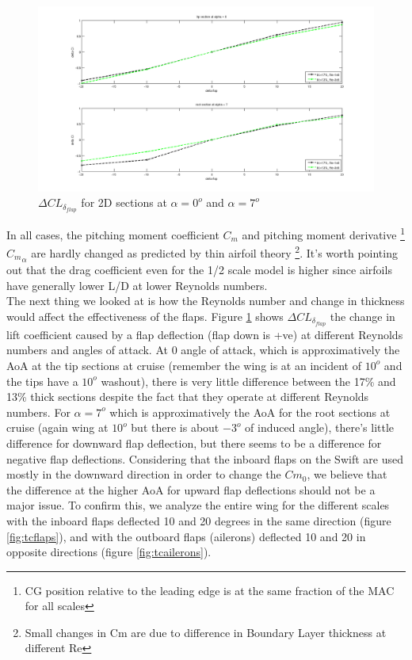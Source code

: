 \documentclass[titlepage,10pt]{article}
\begin{document}
\begin{figure}[h]
\begin{center}
\includegraphics[width=140mm]{flap_effectiveness.png}
\caption{$\Delta CL_{\delta_{flap}}$ for 2D sections at $\alpha=0^o$ and  $\alpha=7^o$}
\label{fig:clflap}
\end{center}
\end{figure}
\clearpage


In all cases, the pitching moment coefficient ${C_m}$ and pitching moment derivative \footnote{CG position relative to the leading edge is at the same fraction of the MAC for all scales} ${C_m}_{\alpha}$ are hardly changed as predicted by thin airfoil theory \footnote{Small changes in Cm are due to difference in Boundary Layer thickness at different Re}. It's worth pointing out that the drag coefficient even for the 1/2 scale model is higher since airfoils have generally lower L/D at lower Reynolds numbers.\\

The next thing we looked at is how the Reynolds number and change in thickness would affect the effectiveness of the flaps. Figure \ref{fig:clflap} shows $\Delta CL_{\delta_{flap}}$ the change in lift coefficient caused by a flap deflection (flap down is +ve) at different Reynolds numbers and angles of attack. At 0 angle of attack, which is approximatively the AoA at the tip sections at cruise (remember the wing is at an incident of $10^o$ and the tips have a $10^o$ washout), there is very little difference between the 17\% and 13\% thick sections despite the fact that they operate at different Reynolds numbers. For $\alpha=7^o$ which is approximatively the AoA for the root sections at cruise (again wing at $10^o$ but there is about $-3^o$ of induced angle), there's little difference for downward flap deflection, but there seems to be a difference for negative flap deflections. Considering that the inboard flaps on the Swift are used mostly in the downward direction in order to change the $Cm_0$, we believe that the difference at the higher AoA for upward flap deflections should not be a major issue. To confirm this, we analyze the entire wing for the different scales with the inboard flaps deflected 10 and 20 degrees in the same direction (figure \ref{fig:tcflaps}), and with the outboard flaps (ailerons) deflected 10 and 20 in opposite directions (figure \ref{fig:tcailerons}).\\
\end{document}
